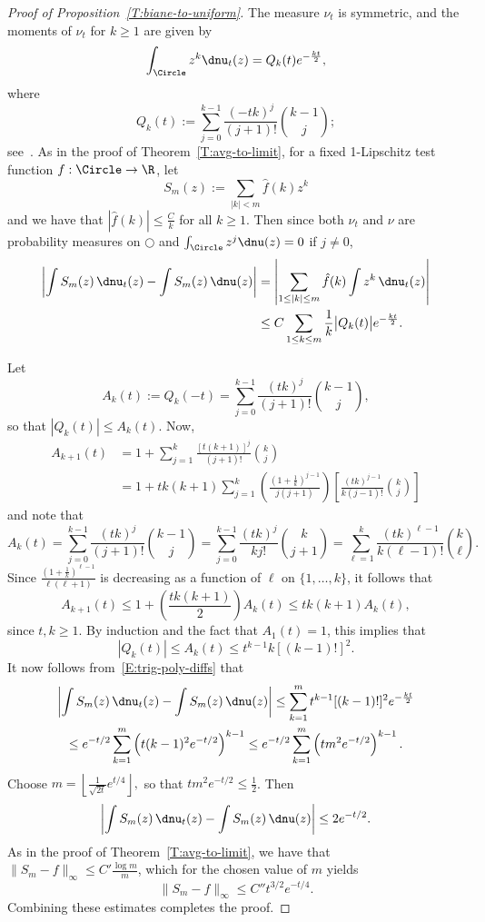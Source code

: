 \begin{proof}[Proof of Proposition~\ref{T:biane-to-uniform}]
The measure $\nu_t$ is symmetric, and the moments of $\nu_t$ for $k\ge 1$ are given by
\[
\int_{\Circle}z^k\dnu_t(z)=Q_k(t)e^{-\frac{kt}{2}},
\]
where
\[
Q_k(t) :=\sum_{j=0}^{k-1}\frac{(-tk)^j}{(j+1)!}\binom{k-1}{j};
\]
see~\cite{Biane1997}. As in the proof of Theorem~\ref{T:avg-to-limit}, for a fixed 1-Lipschitz test function $f:\Circle\to\R$, let
\[
S_m(z) := \sum_{|k|<m} \hat{f}(k)z^k
\]
and we have that $|\hat{f}(k)|\le\frac{C}{k}$ for all $k\ge1$. Then since both $\nu_t$ and $\nu$ are probability measures on $\Circle$ and $\int_{\Circle}z^j\dnu(z)=0$ if $j\neq 0$,
\begin{align}
\notag
\left|\int S_m(z)\,\dnu_t(z)-\int S_m(z)\,\dnu(z)\right| &=\left|\sum_{1\le|k|\le m}\hat{f}(k)\int z^k\,\dnu_t(z)\right| \\\label{E:trig-poly-diffs}
&\le C\sum_{1\le k\le m}\frac{1}{k}\big|Q_k(t)\big|e^{-\frac{kt}{2}}.
\end{align}

Let
\[
A_k(t):=Q_k(-t)=\sum_{j=0}^{k-1}\frac{(tk)^j}{(j+1)!}\binom{k-1}{j},
\]
so that $|Q_k(t)|\le A_k(t)$. Now,
\begin{align*}
A_{k+1}(t)&=1+\sum_{j=1}^k\frac{[t(k+1)]^{j}}{(j+1)!}\binom{k}{j} \\
&=1+tk(k+1)\sum_{j=1}^k\left(\frac{\left(1+\frac{1}{k}\right)^{j-1}}{j(j+1)}\right)\left[\frac{(tk)^{j-1}}{k(j-1)!}\binom{k}{j}\right]
\end{align*}
and note that
\[
A_k(t)=\sum_{j=0}^{k-1}\frac{(tk)^j}{(j+1)!}\binom{k-1}{j}=\sum_{j=0}^{k-1}\frac{(tk)^j}{kj!}\binom{k}{j+1}=\sum_{\ell=1}^k\frac{(tk)^{\ell-1}}{k(\ell-1)!}\binom{k}{\ell}.
\]
Since $\frac{\left(1+\frac{1}{k}\right)^{\ell-1}}{\ell(\ell+1)}$ is decreasing as a function of $\ell$ on $\{1,\ldots,k\}$, it follows that
\[
A_{k+1}(t)\le 1+\left(\frac{tk(k+1)}{2}\right)A_k(t)\le tk(k+1)A_k(t),
\]
since $t,k\ge 1$. By induction and the fact that $A_1(t)=1$, this implies that
\[
|Q_k(t)|\le A_k(t)\le t^{k-1}k[(k-1)!]^2.
\]
It now follows from~\eqref{E:trig-poly-diffs} that
\begin{multline*}
\left|\int S_m(z)\,\dnu_t(z)-\int S_m(z)\,\dnu(z)\right|
\le \sum_{k=1}^mt^{k-1}[(k-1)!]^2e^{-\frac{kt}{2}}\\
\le e^{-t/2}\sum_{k=1}^m\left(t(k-1)^2e^{-t/2}\right)^{k-1}\le e^{-t/2}\sum_{k=1}^m\left(tm^2e^{-t/2}\right)^{k-1}.
\end{multline*}
Choose $m=\left\lfloor\frac{1}{\sqrt{2t}}e^{t/4}\right\rfloor,$ so that $tm^2e^{-t/2}\le\frac{1}{2}$. Then
\[
\left|\int S_m(z)\,\dnu_t(z)-\int S_m(z)\,\dnu(z)\right|\le 2e^{-t/2}.
\]
As in the proof of Theorem~\ref{T:avg-to-limit}, we have that $\|S_m-f\|_\infty\le C'\frac{\log m}{m}$, which for the chosen value of $m$ yields
\[
\|S_m-f\|_\infty\le C''t^{3/2}e^{-t/4}.
\]
Combining these estimates completes the proof.
\end{proof}

